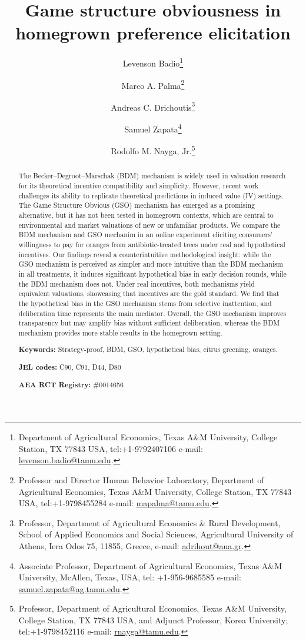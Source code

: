 \documentclass[12pt]{article}
\title{\textbf{Game structure obviousness in homegrown preference elicitation}}
\author[1]{Levenson Badio\thanks{Department of Agricultural Economics, Texas A\&M University, College Station, TX  77843 USA, tel:+1-9792407106 e-mail: \href{mailto:levenson.badio@tamu.edu}{levenson.badio@tamu.edu}.}}
\author[1]{Marco A. Palma\thanks{Professor and Director Human Behavior Laboratory, Department of Agricultural Economics, Texas A\&M University, College Station, TX  77843 USA, tel:+1-9798455284 e-mail: \href{mailto:mapalma@tamu.edu}{mapalma@tamu.edu}.}}
\author[2]{Andreas C. Drichoutis\thanks{Professor, Department of Agricultural Economics \& Rural Development, School of Applied Economics and Social Sciences, Agricultural University of Athens, Iera Odos 75, 11855, Greece, e-mail: \href{mailto:adrihout@aua.gr}{adrihout@aua.gr}.}}
\author[1]{Samuel Zapata\thanks{Associate Professor, Department of Agricultural Economics, Texas A\&M University, McAllen, Texas, USA, tel: +1-956-9685585 e-mail: \href{samuel.zapata@ag.tamu.edu}{samuel.zapata@ag.tamu.edu}.}}
\author[1]{Rodolfo M. Nayga, Jr.\thanks{Professor, Department of Agricultural Economics, Texas A\&M University, College Station, TX  77843 USA, and Adjunct Professor, Korea University; tel:+1-9798452116 e-mail: \href{mailto:rnayga@tamu.edu}{rnayga@tamu.edu}.}}
\affil[1]{Texas A\&M University}
\affil[2]{Agricultural University of Athens}
\date{}
\begin{document}
\maketitle
 \onehalfspacing

\begin{abstract}
\noindent The Becker–Degroot–Marschak (BDM) mechanism is widely used in valuation research for its theoretical incentive compatibility and simplicity. However, recent work challenges its ability to replicate theoretical predictions in induced value (IV) settings. The Game Structure Obvious (GSO) mechanism has emerged as a promising alternative, but it has not been tested in homegrown contexts, which are central to environmental and market valuations of new or unfamiliar products.
We compare the BDM mechanism and GSO mechanim in an online experiment eliciting consumers’ willingness to pay for oranges from antibiotic-treated trees under real and hypothetical incentives.
Our findings reveal a counterintuitive methodological insight: while the GSO mechanism is perceived as simpler and more intuitive than the BDM mechanism in all treatments, it induces significant hypothetical bias in early decision rounds, while the BDM mechanism does not. Under real incentives, both mechanisms yield equivalent valuations, showcasing that incentives are the gold standard. 
We find that the hypothetical bias in the GSO mechanism stems from selective inattention, and deliberation time represents the main mediator. Overall, the GSO mechanism improves transparency but may amplify bias without sufficient deliberation, whereas the BDM mechanism provides more stable results in the homegrown setting.

\textbf{Keywords:} Strategy-proof, BDM, GSO, hypothetical bias, citrus greening, oranges. 
	
\textbf{JEL codes:} C90, C91, D44, D80
 
 \textbf{AEA RCT Registry:} \#0014656
 
 \end{abstract}


\onehalfspacing
\end{document}
